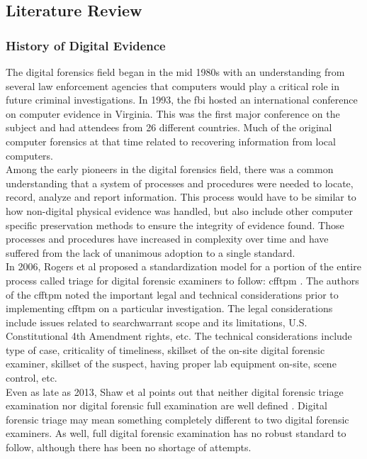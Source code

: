 \documentclass[12pt]{article}
\begin{document}
\subsection{Literature Review}
\subsubsection{History of Digital Evidence}

The digital forensics field began in the mid 1980s with an understanding from several law enforcement
agencies that computers would play a critical role in future criminal investigations.
In 1993, the \gls{fbi} hosted an international conference on computer evidence in Virginia.  This was
the first major conference on the subject and had attendees from 26 different countries.  Much
of the original computer
forensics at that time related to recovering information from local computers.\\

Among the early pioneers in the digital forensics field, there was a common understanding that a
system of processes and procedures were needed to locate, record, analyze and report information.
This process would have to be similar to how non-digital physical evidence was handled, but also
include other computer specific preservation methods to ensure the integrity of evidence found.
Those processes and procedures have increased in complexity over time and have suffered from the
lack of unanimous adoption to a single standard.\\

In 2006, Rogers et al proposed a standardization model for a portion of the entire process called
triage for digital forensic examiners to follow: \gls{cfftpm} \cite{rogers2006computer}.
The authors of the \gls{cfftpm} noted the important legal and technical
considerations prior to implementing \gls{cfftpm} on a particular investigation.  The legal
considerations include issues
related to \gls{searchwarrant} scope and its limitations, U.S. Constitutional 4th Amendment rights, etc.
The technical 
considerations include type of case, criticality of timeliness, skillset of the on-site
digital forensic examiner, 
skillset of the suspect, having proper lab equipment on-site, scene control, etc.\\

Even as late as 2013, Shaw et al points out that neither digital forensic
triage examination nor digital forensic full examination are well defined \cite{shaw2013practical}.
Digital forensic triage may mean something completely different to two digital forensic
examiners.  As well, full digital forensic examination has no robust standard to follow, although
there has been no shortage of attempts.\\
\end{document}
